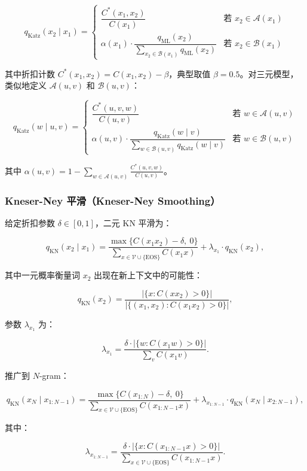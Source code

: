 \documentclass[
  11pt,
  a4paper,
]{article}
\begin{document}
\[q_{\text{Katz}}(x_2 \mid x_1) = \begin{cases} \dfrac{C^*(x_1, x_2)}{C(x_1)} & \text{若 } x_2 \in \mathcal{A}(x_1) \\ \alpha(x_1) \cdot \dfrac{q_{\text{ML}}(x_2)}{\sum_{x_2 \in \mathcal{B}(x_1)} q_{\text{ML}}(x_2)} & \text{若 } x_2 \in \mathcal{B}(x_1) \end{cases}\]

其中折扣计数 \(C^*(x_1, x_2) = C(x_1, x_2) - \beta\)，典型取值
\(\beta = 0.5\)。对三元模型，类似地定义 \(\mathcal{A}(u,v)\) 和
\(\mathcal{B}(u,v)\)：

\[q_{\text{Katz}}(w \mid u, v) = \begin{cases} \dfrac{C^*(u,v,w)}{C(u,v)} & \text{若 } w \in \mathcal{A}(u,v) \\ \alpha(u,v) \cdot \dfrac{q_{\text{Katz}}(w \mid v)}{\sum_{w \in \mathcal{B}(u,v)} q_{\text{Katz}}(w \mid v)} & \text{若 } w \in \mathcal{B}(u,v) \end{cases}\]

其中
\(\alpha(u,v) = 1 - \sum_{w \in \mathcal{A}(u,v)} \frac{C^*(u,v,w)}{C(u,v)}\)。

\subsubsection{Kneser-Ney 平滑（Kneser-Ney
Smoothing）}\label{kneser-ney-ux5e73ux6ed1kneser-ney-smoothing}

给定折扣参数 \(\delta \in [0,1]\)，二元 KN 平滑为：

\[q_{\text{KN}}(x_2 \mid x_1) = \frac{\max\{C(x_1 x_2) - \delta,\ 0\}}{\sum_{x \in \mathcal{V} \cup \{\text{EOS}\}} C(x_1 x)} + \lambda_{x_1} \cdot q_{\text{KN}}(x_2),\]

其中一元概率衡量词 \(x_2\) 出现在新上下文中的可能性：

\[q_{\text{KN}}(x_2) = \frac{|\{x: C(x x_2) > 0\}|}{|\{(x_1, x_2): C(x_1 x_2) > 0\}|},\]

参数 \(\lambda_{x_1}\) 为：

\[\lambda_{x_1} = \frac{\delta \cdot |\{w: C(x_1 w) > 0\}|}{\sum_v C(x_1 v)}.\]

推广到 \(N\)-gram：

\[q_{\text{KN}}(x_N \mid x_{1:N-1}) = \frac{\max\{C(x_{1:N}) - \delta,\ 0\}}{\sum_{x \in \mathcal{V} \cup \{\text{EOS}\}} C(x_{1:N-1} x)} + \lambda_{x_{1:N-1}} \cdot q_{\text{KN}}(x_N \mid x_{2:N-1}),\]

其中：

\[\lambda_{x_{1:N-1}} = \frac{\delta \cdot |\{x: C(x_{1:N-1} x) > 0\}|}{\sum_{x \in \mathcal{V} \cup \{\text{EOS}\}} C(x_{1:N-1} x)}.\]
\end{document}
